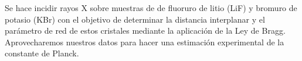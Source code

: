 Se hace incidir rayos X sobre muestras de de fluoruro de litio (LiF) y bromuro de potasio (KBr) con el objetivo de determinar la distancia interplanar y el parámetro de red de estos cristales mediante la aplicación de la Ley de Bragg. Aprovecharemos nuestros datos para hacer una estimación experimental de la constante de Planck.